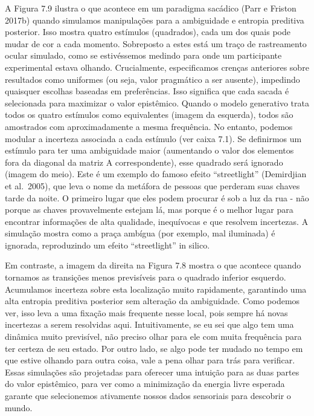 \documentclass[
  12pt,
]{book}
\begin{document}
A Figura 7.9 ilustra o que acontece em um paradigma sacádico (Parr e Friston 2017b) quando simulamos manipulações para a ambiguidade e entropia preditiva posterior. Isso mostra quatro estímulos (quadrados), cada um dos quais pode mudar de cor a cada momento. Sobreposto a estes está um traço de rastreamento ocular simulado, como se estivéssemos medindo para onde um participante experimental estava olhando. Crucialmente, especificamos crenças anteriores sobre resultados como uniformes (ou seja, valor pragmático a ser ausente), impedindo quaisquer escolhas baseadas em preferências. Isso significa que cada sacada é selecionada para maximizar o valor epistêmico. Quando o modelo generativo trata todos os quatro estímulos como equivalentes (imagem da esquerda), todos são amostrados com aproximadamente a mesma frequência. No entanto, podemos modular a incerteza associada a cada estímulo (ver caixa 7.1). Se definirmos um estímulo para ter uma ambiguidade maior (aumentando o valor dos elementos fora da diagonal da matriz A correspondente), esse quadrado será ignorado (imagem do meio). Este é um exemplo do famoso efeito ``streetlight'' (Demirdjian et al.~2005), que leva o nome da metáfora de pessoas que perderam suas chaves tarde da noite. O primeiro lugar que eles podem procurar é sob a luz da rua - não porque as chaves provavelmente estejam lá, mas porque é o melhor lugar para encontrar informações de alta qualidade, inequívocas e que resolvem incertezas. A simulação mostra como a praça ambígua (por exemplo, mal iluminada) é ignorada, reproduzindo um efeito ``streetlight'' in silico.

Em contraste, a imagem da direita na Figura 7.8 mostra o que acontece quando tornamos as transições menos previsíveis para o quadrado inferior esquerdo. Acumulamos incerteza sobre esta localização muito rapidamente, garantindo uma alta entropia preditiva posterior sem alteração da ambiguidade. Como podemos ver, isso leva a uma fixação mais frequente nesse local, pois sempre há novas incertezas a serem resolvidas aqui. Intuitivamente, se eu sei que algo tem uma dinâmica muito previsível, não preciso olhar para ele com muita frequência para ter certeza de seu estado. Por outro lado, se algo pode ter mudado no tempo em que estive olhando para outra coisa, vale a pena olhar para trás para verificar. Essas simulações são projetadas para oferecer uma intuição para as duas partes do valor epistêmico, para ver como a minimização da energia livre esperada garante que selecionemos ativamente nossos dados sensoriais para descobrir o mundo.
\end{document}
